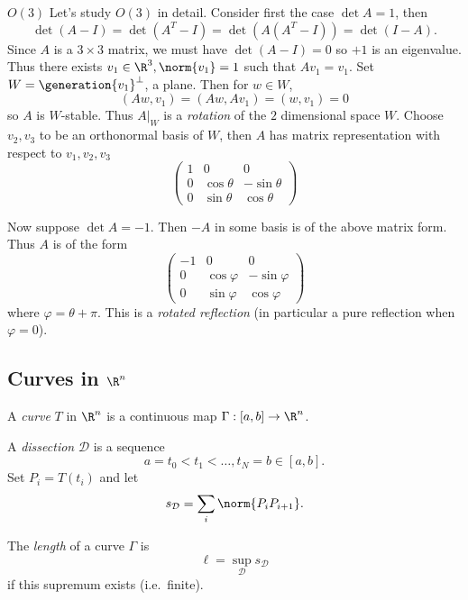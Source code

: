 \documentclass[a4paper]{article}
\begin{document}
\begin{eg}{\(O(3)\)}
Let's study \(O(3)\) in detail. Consider first the case \(\det A = 1\), then
\[
  \det(A - I) = \det(A^T -I) = \det(A(A^T - I)) = \det(I - A).
\]
Since \(A\) is a \(3 \times 3\) matrix, we must have \(\det (A - I) = 0\) so \(+1\) is an eigenvalue. Thus there exists \(v_1 \in \R^3, \norm{v_1} = 1\) such that \(Av_1 = v_1\). Set \(W = \generation{v_1}^\perp\), a plane. Then for \(w \in W\),
\[
  (Aw, v_1) = (Aw, Av_1) = (w, v_1) = 0
\]
so \(A\) is \(W\)-stable. Thus \(A|_W\) is a \emph{rotation} of the \(2\) dimensional space \(W\). Choose \(v_2, v_3\) to be an orthonormal basis of \(W\), then \(A\) has matrix representation with respect to \(v_1, v_2, v_3\)
\[
  \begin{pmatrix}
    1 & 0 & 0 \\
    0 & \cos \theta & -\sin \theta \\
    0 & \sin \theta & \cos \theta
  \end{pmatrix}
\]

Now suppose \(\det A = -1\). Then \(-A\) in some basis is of the above matrix form. Thus \(A\) is of the form
\[
  \begin{pmatrix}
    -1 & 0 & 0 \\
    0 & \cos \varphi & -\sin \varphi \\
    0 & \sin \varphi & \cos \varphi
  \end{pmatrix}
\]
where \(\varphi = \theta + \pi\). This is a \emph{rotated reflection} (in particular a pure reflection when \(\varphi = 0\)).
\end{eg}

\subsection{Curves in \texorpdfstring{\(\R^n\)}{ℝ\^{}n}}

\begin{definition}[Curve]
  A \emph{curve} \(T\) in \(\R^n\) is a continuous map \(\Gamma: [a, b] \to \R^n\).
\end{definition}

A \emph{dissection} \(\mathcal D\) is a sequence
\[
  a = t_0 < t_1 < \dots, t_N = b \in [a, b].
\]
Set \(P_i = T(t_i)\) and let
\[
  s_{\mathcal D} = \sum_i \norm{P_iP_{i + 1}}.
\]

\begin{definition}[Length]
  The \emph{length} of a curve \(\Gamma\) is
  \[
    \ell = \sup_{\mathcal D} s_{\mathcal D}
  \]
  if this supremum exists (i.e.\ finite).
\end{definition}
\end{document}
